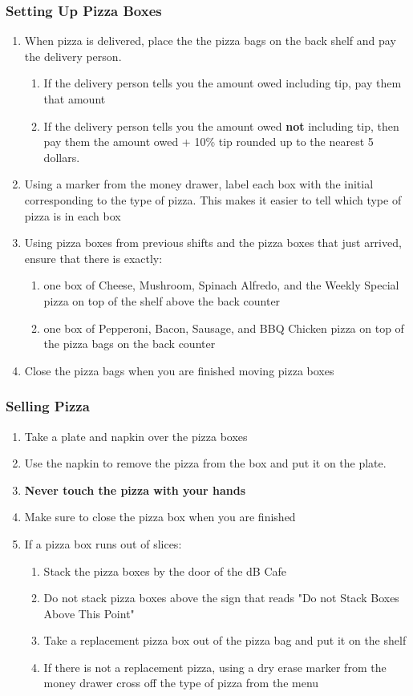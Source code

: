 \documentclass[12pt,onecolumn,letterpaper]{article}
\begin{document}
\subsubsection{Setting Up Pizza Boxes}
\begin{enumerate}
\item When pizza is delivered, place the the pizza bags on the back shelf and pay the delivery person. 
	\begin{enumerate}
	\item If the delivery person tells you the amount owed including tip, pay them that amount
	\item If the delivery person tells you the amount owed \textbf{not} including tip, then pay them the amount owed + 10\% tip rounded up to the nearest 5 dollars.
	\end{enumerate}
\item Using a marker from the money drawer, label each box with the initial corresponding to the type of pizza. This makes it easier to tell which type of pizza is in each box
\item Using pizza boxes from previous shifts and the pizza boxes that just arrived, ensure that there is exactly:
	\begin{enumerate}
	\item one box of Cheese, Mushroom, Spinach Alfredo, and the Weekly Special pizza on top of the shelf above the back counter
	\item one box of Pepperoni, Bacon, Sausage, and BBQ Chicken pizza on top of the pizza bags on the back counter
	\end{enumerate}
\item Close the pizza bags when you are finished moving pizza boxes
\end{enumerate}
\subsubsection{Selling Pizza}
\begin{enumerate}
\item Take a plate and napkin over the pizza boxes
\item Use the napkin to remove the pizza from the box and put it on the plate.
\item \textbf{Never touch the pizza with your hands}
\item Make sure to close the pizza box when you are finished
\item If a pizza box runs out of slices:
	\begin{enumerate}
	\item Stack the pizza boxes by the door of the dB Cafe
	\item Do not stack pizza boxes above the sign that reads "Do not Stack Boxes Above This Point"
	\item Take a replacement pizza box out of the pizza bag and put it on the shelf
	\item If there is not a replacement pizza, using a dry erase marker from the money drawer cross off the type of pizza from the menu
	\end{enumerate}
\end{enumerate}
\end{document}

